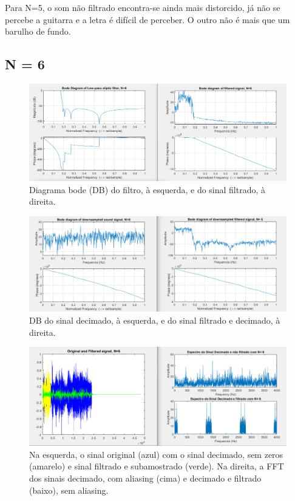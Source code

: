 \documentclass{article}
\begin{document}
\raggedright
\vspace{5mm} %

Para N=5, o som não filtrado encontra-se ainda mais distorcido, já não se percebe a guitarra e a letra é difícil de perceber.
O outro não é mais que um barulho de fundo.

\newpage

\subsection{N = 6}
\vfill
\begin{figure}[h!]
\centering
\includegraphics[scale=0.5]{matlab_test_images/cut_images/fil14.PNG}
\caption{Diagrama bode (DB) do filtro, à esquerda, e do sinal filtrado, à direita.}
\label{fig:matlab_test_images/cut_images/fil14}
\end{figure}
\begin{figure}[h!]
\centering
\includegraphics[scale=0.5]{matlab_test_images/cut_images/fil15.PNG}
\caption{DB do sinal decimado, à esquerda, e do sinal filtrado e decimado, à direita.}
\label{fig:matlab_test_images/cut_images/fil15}
\end{figure}  
\newpage
\begin{figure}[h!]
\centering
\includegraphics[scale=0.5]{matlab_test_images/cut_images/fil16.PNG}
\caption{Na esquerda, o sinal original (azul) com o sinal decimado, sem zeros (amarelo) e sinal filtrado e subamostrado (verde). Na direita, a FFT dos sinais decimado, com aliasing (cima) e decimado e filtrado (baixo), sem aliasing.}
\label{fig:matlab_test_images/cut_images/fil16}
\end{figure}  
\end{document}
